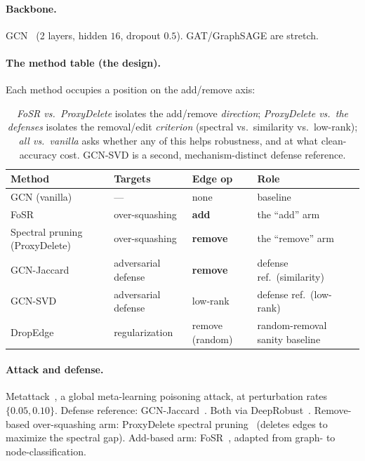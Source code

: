\documentclass[11pt]{article}
\begin{document}
\paragraph{Backbone.} GCN~\citep{kipf2017gcn} (2 layers, hidden $16$, dropout $0.5$). GAT/GraphSAGE are stretch.

\paragraph{The method table (the design).} Each method occupies a position on the add/remove axis:

\begin{table}[t]
\centering\small
\begin{tabular}{@{}llll@{}}
\toprule
\textbf{Method} & \textbf{Targets} & \textbf{Edge op} & \textbf{Role} \\
\midrule
GCN (vanilla)                  & ---                 & none            & baseline \\
FoSR                           & over-squashing      & \textbf{add}    & the ``add'' arm \\
Spectral pruning (ProxyDelete) & over-squashing      & \textbf{remove} & the ``remove'' arm \\
GCN-Jaccard                    & adversarial defense & \textbf{remove} & defense ref.\ (similarity) \\
GCN-SVD                        & adversarial defense & low-rank        & defense ref.\ (low-rank) \\
DropEdge                       & regularization      & remove (random) & random-removal sanity baseline \\
\bottomrule
\end{tabular}
\caption{\emph{FoSR vs.\ ProxyDelete} isolates the add/remove \emph{direction}; \emph{ProxyDelete vs.\ the
defenses} isolates the removal/edit \emph{criterion} (spectral vs.\ similarity vs.\ low-rank); \emph{all
vs.\ vanilla} asks whether any of this helps robustness, and at what clean-accuracy cost. GCN-SVD is a
second, mechanism-distinct defense reference.}
\end{table}

\paragraph{Attack and defense.} Metattack~\citep{zugner2019metattack}, a global meta-learning poisoning
attack, at perturbation rates $\{0.05, 0.10\}$. Defense reference: GCN-Jaccard~\citep{wu2019jaccard}. Both
via DeepRobust~\citep{li2021deeprobust}. Remove-based over-squashing arm: ProxyDelete spectral
pruning~\citep{jamadandi2024spectral} (deletes edges to maximize the spectral gap). Add-based arm:
FoSR~\citep{karhadkar2023fosr}, adapted from graph- to node-classification.
\end{document}
